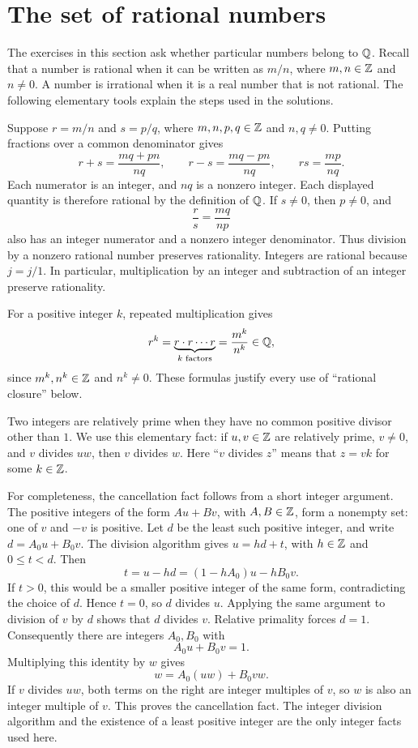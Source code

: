 \section{The set of rational numbers}
\label{sec:rational-numbers}

The exercises in this section ask whether particular numbers belong to
$\mathbb{Q}$. Recall that a number is rational when it can be written as $m/n$,
where $m,n\in\mathbb{Z}$ and $n\ne0$. A number is irrational when it is a real
number that is not rational. The following elementary tools explain the
steps used in the solutions.

Suppose $r=m/n$ and $s=p/q$, where $m,n,p,q\in\mathbb{Z}$ and $n,q\ne0$.
Putting fractions over a common denominator gives
\[
 r+s=\frac{mq+pn}{nq},\qquad
 r-s=\frac{mq-pn}{nq},\qquad
 rs=\frac{mp}{nq}.
\]
Each numerator is an integer, and $nq$ is a nonzero integer. Each displayed
quantity is therefore rational by the definition of $\mathbb{Q}$. If $s\ne0$,
then $p\ne0$, and
\[
 \frac{r}{s}=\frac{mq}{np}
\]
also has an integer numerator and a nonzero integer denominator. Thus
division by a nonzero rational number preserves rationality. Integers
are rational because $j=j/1$. In particular, multiplication by an integer
and subtraction of an integer preserve rationality.

For a positive integer $k$, repeated multiplication gives
\[
 r^k=\underbrace{r\cdot r\cdots r}_{k\text{ factors}}
     =\frac{m^k}{n^k}\in\mathbb{Q},
\]
since $m^k,n^k\in\mathbb{Z}$ and $n^k\ne0$. These formulas justify every use of
``rational closure'' below.

Two integers are relatively prime when they have no common positive
divisor other than $1$. We use this elementary fact: if $u,v\in\mathbb{Z}$ are
relatively prime, $v\ne0$, and $v$ divides $uw$, then $v$ divides $w$.
Here ``$v$ divides $z$'' means that $z=vk$ for some $k\in\mathbb{Z}$.

For completeness, the cancellation fact follows from a short integer
argument. The positive integers of the form $Au+Bv$, with $A,B\in\mathbb{Z}$,
form a nonempty set: one of $v$ and $-v$ is positive. Let $d$ be the
least such positive integer, and write $d=A_0u+B_0v$. The division
algorithm gives $u=hd+t$, with $h\in\mathbb{Z}$ and $0\le t<d$. Then
\[
 t=u-hd=(1-hA_0)u-hB_0v.
\]
If $t>0$, this would be a smaller positive integer of the same form,
contradicting the choice of $d$. Hence $t=0$, so $d$ divides $u$.
Applying the same argument to division of $v$ by $d$ shows that $d$
divides $v$. Relative primality forces $d=1$. Consequently there are
integers $A_0,B_0$ with
\[
 A_0u+B_0v=1.
\]
Multiplying this identity by $w$ gives
\[
 w=A_0(uw)+B_0vw.
\]
If $v$ divides $uw$, both terms on the right are integer multiples of
$v$, so $w$ is also an integer multiple of $v$. This proves the
cancellation fact. The integer division algorithm and the existence
of a least positive integer are the only integer facts used here.


